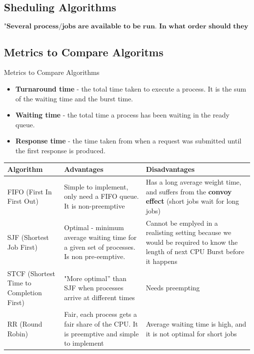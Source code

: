 \documentclass[a4paper, 10pt]{article}
\begin{document}
\subsection{Sheduling Algorithms}
$$\textbf{"Several process/jobs are available to be run. In what order should they be executed?}$$
\subsection{Metrics to Compare Algoritms}
\begin{conceptbox}{Metrics to Compare Algorithms}{}
    \begin{itemize}
        \item \textbf{Turnaround time} - the total time taken to execute a process. It is the sum of the waiting time and the burst time.
        \item \textbf{Waiting time} - the total time a process has been waiting in the ready queue.
        \item \textbf{Response time} - the time taken from when a request was submitted until the first response is produced.
    \end{itemize}
\end{conceptbox}
\begin{table}[h!]
    \centering
    \begin{tabularx}{\textwidth}{@{} X X X @{}}
        \toprule
        Algorithm                & Advantages                                                                                                                    & Disadvantages \\
        \midrule
        FIFO (First In First Out)
                                 & Simple to implement, only need a FIFO queue. It is non-preemptive
                                 & Has a long average weight time, and suffers from the \textbf{convoy effect} (short jobs wait for long jobs)
        \\
        \addlinespace[2ex]
        SJF (Shortest Job First) & Optimal - minimum average waiting time for a given set of processes.
        Is non pre-eemptive.
                                 & Cannot be emplyed in a realisting setting because we would be required to know the length of next CPU Burst before it happens
        \\
        \addlinespace[2ex]
        STCF (Shortest Time to Completion First)
                                 & "More optimal” than SJF when processes arrive at
        different times
                                 & Needs preempting
        \\
        \addlinespace[2ex]
        RR (Round Robin)         & Fair, each process gets a fair share of the CPU. It is preemptive and simple to implement
                                 & Average waiting time is high, and it is not optimal for short jobs
    \end{tabularx}
\end{table}
\end{document}
